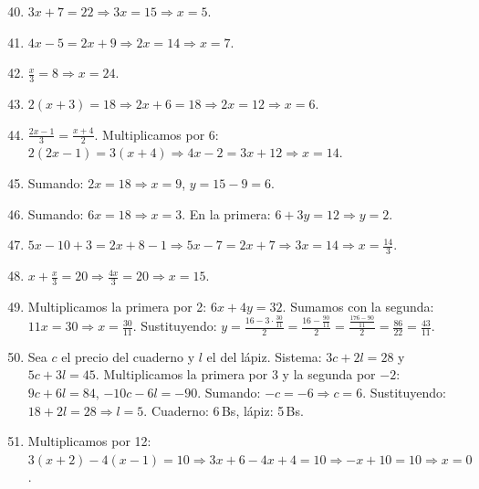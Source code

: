 \documentclass[12pt, letterpaper]{article}
\begin{document}
  \begin{enumerate}[leftmargin=*, label=\textbf{\arabic*.}]
    \setcounter{enumi}{39}
    \item $3x + 7 = 22 \Rightarrow 3x = 15 \Rightarrow x = 5$.

    \item $4x - 5 = 2x + 9 \Rightarrow 2x = 14 \Rightarrow x = 7$.

    \item $\frac{x}{3} = 8 \Rightarrow x = 24$.

    \item $2(x+3) = 18 \Rightarrow 2x + 6 = 18 \Rightarrow 2x = 12 \Rightarrow x = 6$.

    \item $\frac{2x-1}{3} = \frac{x+4}{2}$. Multiplicamos por 6: $2(2x-1) = 3(x+4) \Rightarrow 4x - 2 = 3x + 12 \Rightarrow x = 14$.

    \item Sumando: $2x = 18 \Rightarrow x = 9$, $y = 15 - 9 = 6$.

    \item Sumando: $6x = 18 \Rightarrow x = 3$. En la primera: $6 + 3y = 12 \Rightarrow y = 2$.

    \item $5x - 10 + 3 = 2x + 8 - 1 \Rightarrow 5x - 7 = 2x + 7 \Rightarrow 3x = 14 \Rightarrow x = \frac{14}{3}$.

    \item $x + \frac{x}{3} = 20 \Rightarrow \frac{4x}{3} = 20 \Rightarrow x = 15$.

    \item Multiplicamos la primera por 2: $6x + 4y = 32$. Sumamos con la segunda: $11x = 30 \Rightarrow x = \frac{30}{11}$. Sustituyendo: $y = \frac{16 - 3 \cdot \frac{30}{11}}{2} = \frac{16 - \frac{90}{11}}{2} = \frac{\frac{176 - 90}{11}}{2} = \frac{86}{22} = \frac{43}{11}$.

    \item Sea $c$ el precio del cuaderno y $l$ el del lápiz. Sistema: $3c + 2l = 28$ y $5c + 3l = 45$. Multiplicamos la primera por 3 y la segunda por $-2$: $9c + 6l = 84$, $-10c - 6l = -90$. Sumando: $-c = -6 \Rightarrow c = 6$. Sustituyendo: $18 + 2l = 28 \Rightarrow l = 5$. Cuaderno: 6\,Bs, lápiz: 5\,Bs.

    \item Multiplicamos por 12: $3(x+2) - 4(x-1) = 10 \Rightarrow 3x + 6 - 4x + 4 = 10 \Rightarrow -x + 10 = 10 \Rightarrow x = 0$.
  \end{enumerate}

\fi
\end{document}
